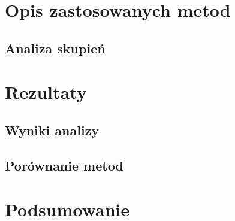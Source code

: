 \documentclass[a4paper,12pt]{article}
\begin{document}
\section{Opis zastosowanych metod}

\subsection{Analiza skupień}

\section{Rezultaty}

\subsection{Wyniki analizy}

\subsection{Porównanie metod}

\section{Podsumowanie}
\end{document}
